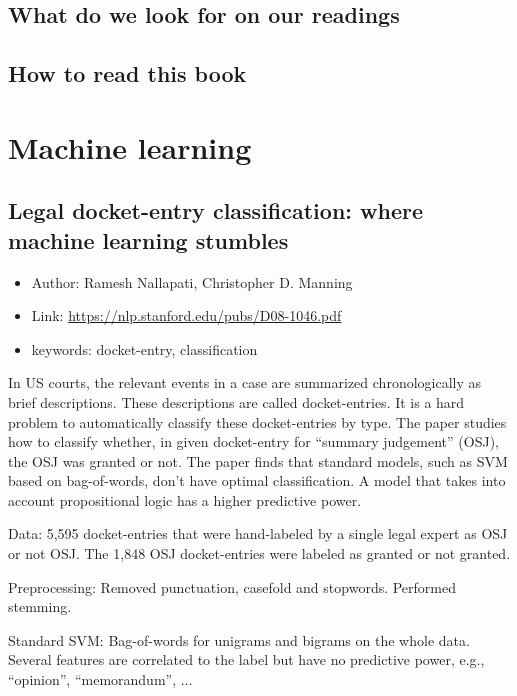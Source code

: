 \documentclass[]{report}
\providecommand{\tightlist}{%
  \setlength{\itemsep}{0pt}\setlength{\parskip}{0pt}}
\theoremstyle{definition}
\theoremstyle{definition}
\theoremstyle{definition}
\theoremstyle{remark}
\begin{document}
\section{What do we look for on our
readings}\label{what-do-we-look-for-on-our-readings}

\section{How to read this book}\label{how-to-read-this-book}

\chapter{Machine learning}\label{machine-learning}

\section{Legal docket-entry classification: where machine learning
stumbles}\label{legal-docket-entry-classification-where-machine-learning-stumbles}

\begin{itemize}
\tightlist
\item
  Author: Ramesh Nallapati, Christopher D. Manning
\item
  Link: \url{https://nlp.stanford.edu/pubs/D08-1046.pdf}
\item
  keywords: docket-entry, classification
\end{itemize}

In US courts, the relevant events in a case are summarized
chronologically as brief descriptions. These descriptions are called
docket-entries. It is a hard problem to automatically classify these
docket-entries by type. The paper studies how to classify whether, in
given docket-entry for ``summary judgement'' (OSJ), the OSJ was granted
or not. The paper finds that standard models, such as SVM based on
bag-of-words, don't have optimal classification. A model that takes into
account propositional logic has a higher predictive power.

Data: 5,595 docket-entries that were hand-labeled by a single legal
expert as OSJ or not OSJ. The 1,848 OSJ docket-entries were labeled as
granted or not granted.

Preprocessing: Removed punctuation, casefold and stopwords. Performed
stemming.

Standard SVM: Bag-of-words for unigrams and bigrams on the whole data.
Several features are correlated to the label but have no predictive
power, e.g., ``opinion'', ``memorandum'', \(\ldots\)
\end{document}
